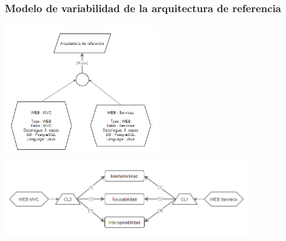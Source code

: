 \documentclass[10pt,a4paper,openany]{book}
\begin{document}
\subsubsection{Modelo de variabilidad de la arquitectura de referencia}
\begin{center}
\includegraphics[width=0.5\textwidth]{model1}\\
\includegraphics[width=0.8\textwidth]{model2}
\end{center}
\end{document}

